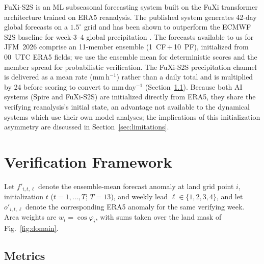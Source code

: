 \documentclass[11pt]{article}
\begin{document}
FuXi-S2S \citep{chen2024} is an ML subseasonal forecasting system built on
the FuXi transformer architecture trained on ERA5 reanalysis. The published
system generates 42-day global forecasts on a $1.5^{\circ}$ grid and has been
shown to outperform the ECMWF S2S baseline for week-3--4 global precipitation
\citep{chen2024}. The forecasts available to us for JFM~2026 comprise an
11-member ensemble (1~CF\,$+$\,10~PF), initialized from 00~UTC ERA5 fields;
we use the ensemble mean for deterministic scores and the member spread for
probabilistic verification. The FuXi-S2S precipitation channel is delivered
as a mean rate (mm\,h$^{-1}$) rather than a daily total and is multiplied by
24 before scoring to convert to mm\,day$^{-1}$ (Section~\ref{sec:metrics}).
Because both AI systems (Spire and FuXi-S2S) are initialized directly from
ERA5, they share the verifying reanalysis's initial state, an advantage not
available to the dynamical systems which use their own model analyses; the
implications of this initialization asymmetry are discussed in
Section~\ref{sec:limitations}.

\section{Verification Framework}\label{sec:verif}

Let $f'_{i,t,\ell}$ denote the ensemble-mean forecast anomaly at land
grid point $i$, initialization $t$ ($t=1,\dots,T$; $T=13$), and weekly
lead $\ell\in\{1,2,3,4\}$, and let $o'_{i,t,\ell}$ denote the
corresponding ERA5 anomaly for the same verifying week. Area weights
are $w_i=\cos\varphi_i$, with sums taken over the land mask of
Fig.~\ref{fig:domain}.

\subsection{Metrics}\label{sec:metrics}
\end{document}

